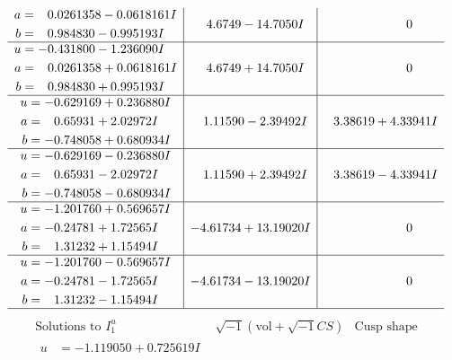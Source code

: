 \documentclass[1p]{elsarticle_modified}
\theoremstyle{definition}
\newcommand{\I}{\sqrt{-1}}
\begin{document}
$$\begin{array}{c|c|c}
\begin{aligned}
a &= \phantom{-}0.0261358 - 0.0618161 I \\
b &= \phantom{-}0.984830 - 0.995193 I\end{aligned}
 & \phantom{-}4.6749 - 14.7050 I & \phantom{-0.000000 } 0 \\ \hline\begin{aligned}
u &= -0.431800 - 1.236090 I \\
a &= \phantom{-}0.0261358 + 0.0618161 I \\
b &= \phantom{-}0.984830 + 0.995193 I\end{aligned}
 & \phantom{-}4.6749 + 14.7050 I & \phantom{-0.000000 } 0 \\ \hline\begin{aligned}
u &= -0.629169 + 0.236880 I \\
a &= \phantom{-}0.65931 + 2.02972 I \\
b &= -0.748058 + 0.680934 I\end{aligned}
 & \phantom{-}1.11590 - 2.39492 I & \phantom{-}3.38619 + 4.33941 I \\ \hline\begin{aligned}
u &= -0.629169 - 0.236880 I \\
a &= \phantom{-}0.65931 - 2.02972 I \\
b &= -0.748058 - 0.680934 I\end{aligned}
 & \phantom{-}1.11590 + 2.39492 I & \phantom{-}3.38619 - 4.33941 I \\ \hline\begin{aligned}
u &= -1.201760 + 0.569657 I \\
a &= -0.24781 + 1.72565 I \\
b &= \phantom{-}1.31232 + 1.15494 I\end{aligned}
 & -4.61734 + 13.19020 I & \phantom{-0.000000 } 0 \\ \hline\begin{aligned}
u &= -1.201760 - 0.569657 I \\
a &= -0.24781 - 1.72565 I \\
b &= \phantom{-}1.31232 - 1.15494 I\end{aligned}
 & -4.61734 - 13.19020 I & \phantom{-0.000000 } 0\\
 \hline 
 \end{array}$$\newpage$$\begin{array}{c|c|c}  
\text{Solutions to }I^u_{1}& \I (\text{vol} + \sqrt{-1}CS) & \text{Cusp shape}\\
 \hline 
\begin{aligned}
u &= -1.119050 + 0.725619 I \\

\end{aligned}
\end{array}$$
\end{document}
